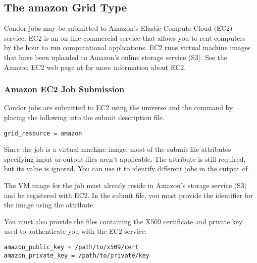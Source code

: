 \subsection{\label{sec:Amazon}The amazon Grid Type }

Condor jobs may be submitted to Amazon's Elastic Compute Cloud (EC2)
service.
EC2 is an on-line commercial service that allows you to rent computers
by the hour to run computational applications.
EC2 runs virtual machine images that have been uploaded to Amazon's
online storage service (S3).
See the Amazon EC2 web page at  for more
information about EC2.

\subsubsection{\label{sec:Amazon-submit}Amazon EC2 Job Submission}

Condor jobs are submitted to EC2
using the  universe and the
 command  by placing the following
into the submit description file.
\begin{verbatim}
grid_resource = amazon
\end{verbatim}

Since the job is a virtual machine image, most of the submit file
attributes specifying input or output files aren't applicable. The
 attribute is still required, but its value is
ignored. You can use it to identify different jobs in the output of
.

The VM image for the job must already reside in Amazon's storage
service (S3) and be registered with EC2. In the submit file, you
must provide the identifier for the image using the
 attribute.

You must also provide the files containing the X509 certificate and
private key used to authenticate you with the EC2 service:

\begin{verbatim}
amazon_public_key = /path/to/x509/cert
amazon_private_key = /path/to/private/key
\end{verbatim}

